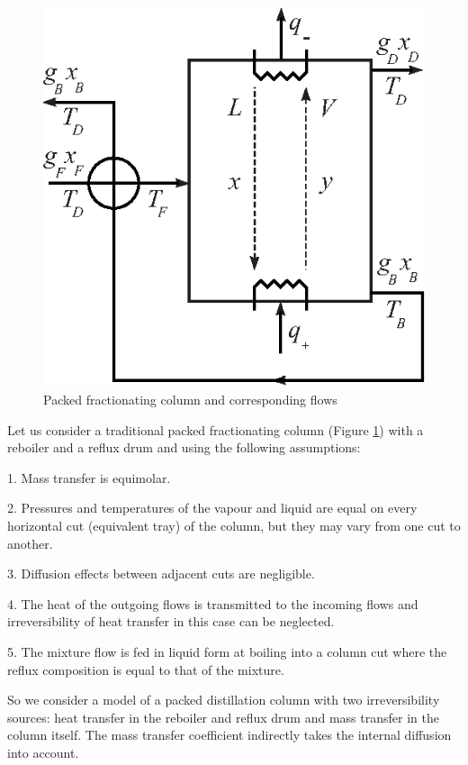 \documentclass[12pt]{article}
\begin{document}
\begin{figure}[bth]
\centering
\includegraphics{pic1new1.eps}
\caption{Packed fractionating column and corresponding flows}
\label{fig:pic1new}
\end{figure}

Let us consider a traditional packed fractionating column (Figure \ref{fig:pic1new}) with a reboiler and a reflux drum and using the following assumptions:

1.	Mass transfer is equimolar.

2.	Pressures and temperatures of the vapour and liquid are equal on every horizontal cut (equivalent tray) of the column, but they may vary from one cut to another.

3.	Diffusion effects between adjacent cuts are negligible. 

4.      The heat of the outgoing flows is transmitted to the incoming flows and irreversibility  of heat transfer in this case can be neglected.

5.      The mixture flow is fed in liquid form at boiling into a column cut where the reflux composition is equal to that of the mixture.

   So we consider a model of a packed distillation column with two irreversibility sources: heat transfer in the reboiler and reflux drum and mass transfer in the column itself. The mass transfer coefficient indirectly takes the internal diffusion into account.   
\end{document}
